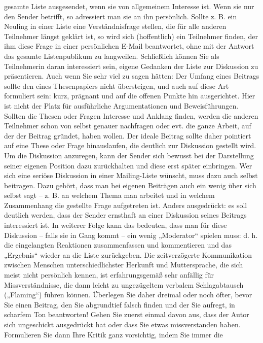 \documentclass[]{book}
\theoremstyle{definition}
\theoremstyle{definition}
\theoremstyle{definition}
\theoremstyle{remark}
\begin{document}
gesamte Liste ausgesendet, wenn sie von allgemeinem Interesse ist. Wenn
sie nur den Sender betrifft, so adressiert man sie an ihn persönlich.
Sollte z. B. ein Neuling in einer Liste eine Verständnisfrage stellen,
die für alle anderen Teilnehmer längst geklärt ist, so wird sich
(hoffentlich) ein Teilnehmer finden, der ihm diese Frage in einer
persönlichen E-Mail beantwortet, ohne mit der Antwort das gesamte
Listenpublikum zu langweilen. Schließlich können Sie als Teilnehmerin
daran interessiert sein, eigene Gedanken der Liste zur Diskussion zu
präsentieren. Auch wenn Sie sehr viel zu sagen hätten: Der Umfang eines
Beitrags sollte den eines Thesenpapiers nicht übersteigen, und auch auf
diese Art formuliert sein: kurz, prägnant und auf die offenen Punkte hin
ausgerichtet. Hier ist nicht der Platz für ausführliche Argumentationen
und Beweisführungen. Sollten die Thesen oder Fragen Interesse und
Anklang finden, werden die anderen Teilnehmer schon von selbst genauer
nachfragen oder evt. die ganze Arbeit, auf der der Beitrag gründet,
haben wollen. Der ideale Beitrag sollte daher pointiert auf eine These
oder Frage hinauslaufen, die deutlich zur Diskussion gestellt wird. Um
die Diskussion anzuregen, kann der Sender sich bewusst bei der
Darstellung seiner eigenen Position dazu zurückhalten und diese erst
später einbringen. Wer sich eine seriöse Diskussion in einer
Mailing-Liste wünscht, muss dazu auch selbst beitragen. Dazu gehört,
dass man bei eigenen Beiträgen auch ein wenig über sich selbst sagt --
z. B. an welchem Thema man arbeitet und in welchem Zusammenhang die
gestellte Frage aufgetreten ist. Anders ausgedrückt: es soll deutlich
werden, dass der Sender ernsthaft an einer Diskussion seines Beitrags
interessiert ist. In weiterer Folge kann das bedeuten, dass man für
diese Diskussion -- falls sie in Gang kommt -- ein wenig „Moderator``
spielen muss: d. h. die eingelangten Reaktionen zusammenfassen und
kommentieren und das „Ergebnis`` wieder an die Liste zurückgeben. Die
zeitverzögerte Kommunikation zwischen Menschen unterschiedlichster
Herkunft und Muttersprache, die sich meist nicht persönlich kennen, ist
erfahrungsgemäß sehr anfällig für Missverständnisse, die dann leicht zu
ungezügeltem verbalem Schlagabtausch („Flaming``) führen können.
Überlegen Sie daher dreimal oder noch öfter, bevor Sie einen Beitrag,
den Sie abgrundtief falsch finden und der Sie aufregt, in scharfem Ton
beantworten! Gehen Sie zuerst einmal davon aus, dass der Autor sich
ungeschickt ausgedrückt hat oder dass Sie etwas missverstanden haben.
Formulieren Sie dann Ihre Kritik ganz vorsichtig, indem Sie immer die
\end{document}
